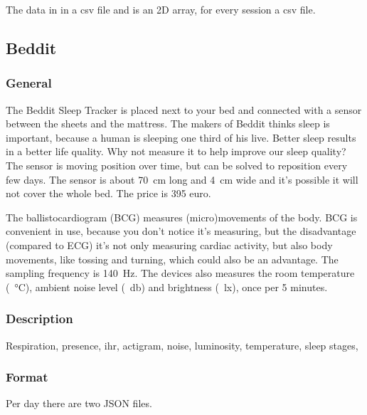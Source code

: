 

		The data in in a csv file and is an 2D array, for every session a csv file.
	\subsection{Beddit}
		\subsubsection{General}
		The Beddit Sleep Tracker is placed next to your bed and connected with a sensor between the sheets and the mattress. The makers of Beddit thinks sleep is important, because a human is sleeping one third of his live. Better sleep results in a better life quality. Why not measure it to help improve our sleep quality? The sensor is moving position over time, but can be solved to reposition every few days. The sensor is about \SI{70}{\centi\metre} long and \SI{4}{\centi\metre} wide and it's possible it will not cover the whole bed. 
			The price is 395 euro.

			The ballistocardiogram (BCG) measures (micro)movements of the body.\cite{beddit}
			BCG is convenient in use, because you don't notice it's measuring, but the disadvantage (compared to ECG) it's not only measuring cardiac activity, but also body movements, like tossing and turning, which could also be an advantage.\cite{bcg} The sampling frequency is \SI{140}{\hertz}. The devices also measures the room temperature (\SI{}{\celsius}), ambient noise level (\SI{}{\decibel}) and brightness (\SI{}{\lux}), once per 5 minutes.\cite{bedditapi}




			\subsubsection{Description}
				Respiration, presence, ihr, actigram, noise, luminosity, temperature, sleep stages, 
			\subsubsection{Format}
			Per day there are two JSON files.
			\lstset { 
				basicstyle = \footnotesize,
				tabsize = 2
			}


